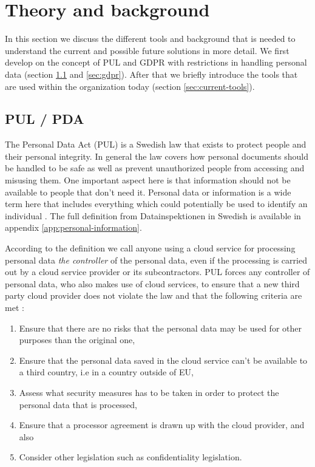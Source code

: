 \section{Theory and background}
\label{sec:background}
In this section we discuss the different tools and background that is needed to understand the current and possible future solutions in more detail. We first develop on the concept of PUL and GDPR with restrictions in handling personal data (section \ref{sec:pul} and \ref{sec:gdpr}). After that we briefly introduce the tools that are used within the organization today (section \ref{sec:current-tools}).

\subsection{PUL / PDA}
\label{sec:pul}
The Personal Data Act (PUL) is a Swedish law that exists to protect people and their personal integrity.  In general the law covers how personal documents should be handled to be safe as well as prevent unauthorized people from accessing and misusing them.  One important aspect here is that information should not be available to people that don't need it.
Personal data or information is a wide term here that includes everything which could potentially be used to identify an individual \cite{Datainspektionen2015}. The full definition from Datainspektionen in Swedish is available in appendix \ref{app:personal-information}.

According to the definition we call anyone using a cloud service for processing personal data \textit{the controller} of the personal data, even if the processing is carried out by a cloud service provider or its subcontractors. PUL forces any controller of personal data, who also makes use of cloud services, to ensure that a new third party cloud provider does not violate the law and that the following criteria are met \cite{DATAINSPEKTIONEN} :
\begin{enumerate}
\item Ensure that there are no risks that the personal data may be used for other purposes than the original one,
\item Ensure that the personal data saved in the cloud service can’t be available to a third country, i.e in a country outside of EU,
\item Assess what security measures has to be taken in order to protect the personal data that is processed,
\item Ensure that a processor agreement is drawn up with the cloud provider, and also
\item Consider other legislation such as confidentiality legislation.
\end{enumerate}


